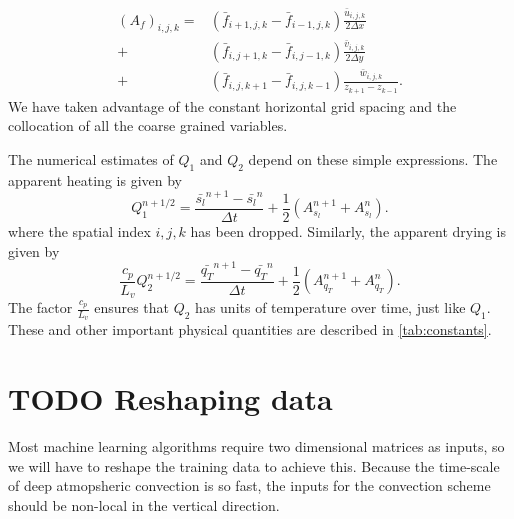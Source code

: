 \documentclass{report}
\begin{document}

\begin{align}
  (A_f)_{i,j,k} = &\left( \bar{f}_{i+1,j,k} - \bar{f}_{i-1,j,k} \right) \frac{\bar{u}_{i,j,k}}{2 \Delta x}\\
              +&\left( \bar{f}_{i,j+1,k} - \bar{f}_{i,j-1,k} \right) \frac{\bar{v}_{i,j,k}}{2 \Delta y}\nonumber\\
              +& \left(  \bar{f}_{i,j,k+1} - \bar{f}_{i,j,k-1} \right) \frac{\bar{w}_{i,j,k}}{z_{k+1} - z_{k-1}}.\nonumber
\end{align}
We have taken advantage of the constant horizontal grid spacing and the
collocation of all the coarse grained variables.

The numerical estimates of $Q_1$ and $Q_2$ depend on these simple expressions.
The apparent heating is given by
\begin{equation}
  \label{eq:q1-num}
  Q_1^{n+1/2} = \frac{\bar{s_l}^{n+1} - \bar{s_l}^{n} }{\Delta t}
            + \frac{1}{2} \left( A^{n+1}_{s_l}  + A^{n}_{s_l} \right).
\end{equation}
where the spatial index $i,j,k$ has been dropped. Similarly, the apparent
drying is given by
\begin{equation}
  \label{eq:q2-num}
  \frac{c_p}{L_v} Q_2^{n+1/2} = \frac{\bar{q_T}^{n+1} - \bar{q_T}^{n} }{\Delta t}
            + \frac{1}{2} \left( A^{n+1}_{q_T}  + A^{n}_{q_T} \right).
\end{equation}
The factor $\frac{c_p}{L_v}$ ensures that $Q_2$ has units of temperature over
time, just like $Q_1$. These and other important physical quantities are
described in \autoref{tab:constants}.

\section{TODO Reshaping data}

Most machine learning algorithms require two dimensional matrices as inputs, so
we will have to reshape the training data to achieve this. Because the
time-scale of deep atmopsheric convection is so fast, the inputs for the
convection scheme should be non-local in the vertical direction.
\end{document}

